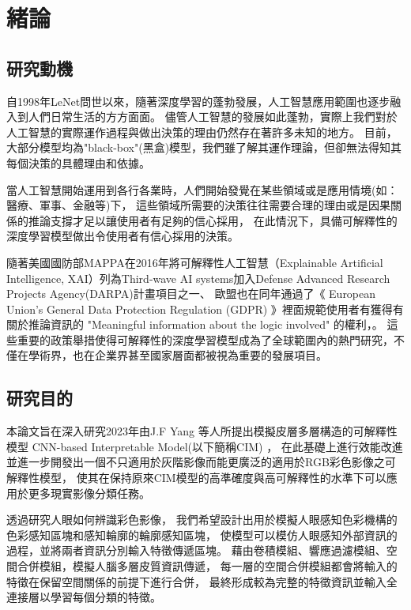 \documentclass[class=NCU_thesis, crop=false]{standalone}
\begin{document}
\chapter{緒論}
\section{研究動機}

自1998年LeNet\cite{726791}問世以來，隨著深度學習的蓬勃發展，人工智慧應用範圍也逐步融入到人們日常生活的方方面面。
儘管人工智慧的發展如此蓬勃，實際上我們對於人工智慧的實際運作過程與做出決策的理由仍然存在著許多未知的地方。
目前，大部分模型均為"black-box"(黑盒)模型，我們雖了解其運作理論，但卻無法得知其每個決策的具體理由和依據。

當人工智慧開始運用到各行各業時，人們開始發覺在某些領域或是應用情境(如：醫療、軍事、金融等)下，
這些領域所需要的決策往往需要合理的理由或是因果關係的推論支撐才足以讓使用者有足夠的信心採用，
在此情況下，具備可解釋性的深度學習模型做出令使用者有信心採用的決策。

隨著美國國防部MAPPA在2016年將可解釋性人工智慧（Explainable Artificial Intelligence, XAI）列為Third-wave AI systems加入Defense Advanced Research Projects Agency(DARPA)計畫項目之一\cite{DARPA}、
歐盟也在同年通過了《 European Union's General Data Protection Regulation (GDPR) 》裡面規範使用者有獲得有關於推論資訊的 "Meaningful information about the logic involved" 的權利\cite{GDPR2016a}，\cite{doi:10.1080/13600834.2019.1573501}。 這些重要的政策舉措使得可解釋性的深度學習模型成為了全球範圍內的熱門研究，不僅在學術界，也在企業界甚至國家層面都被視為重要的發展項目。

\pagebreak
\section{研究目的}
本論文旨在深入研究2023年由J.F Yang 等人所提出模擬皮層多層構造的可解釋性模型 CNN-based Interpretable Model(以下簡稱CIM) \cite{YangCNNInterpretable}，
在此基礎上進行效能改進並進一步開發出一個不只適用於灰階影像而能更廣泛的適用於RGB彩色影像之可解釋性模型，
使其在保持原來CIM模型的高準確度與高可解釋性的水準下可以應用於更多現實影像分類任務。

透過研究人眼如何辨識彩色影像，
我們希望設計出用於模擬人眼感知色彩機構的色彩感知區塊和感知輪廓的輪廓感知區塊，
使模型可以模仿人眼感知外部資訊的過程，並將兩者資訊分別輸入特徵傳遞區塊。
藉由卷積模組、響應過濾模組、空間合併模組，模擬人腦多層皮質資訊傳遞，
每一層的空間合併模組都會將輸入的特徵在保留空間關係的前提下進行合併，
最終形成較為完整的特徵資訊並輸入全連接層以學習每個分類的特徵。
\end{document}
